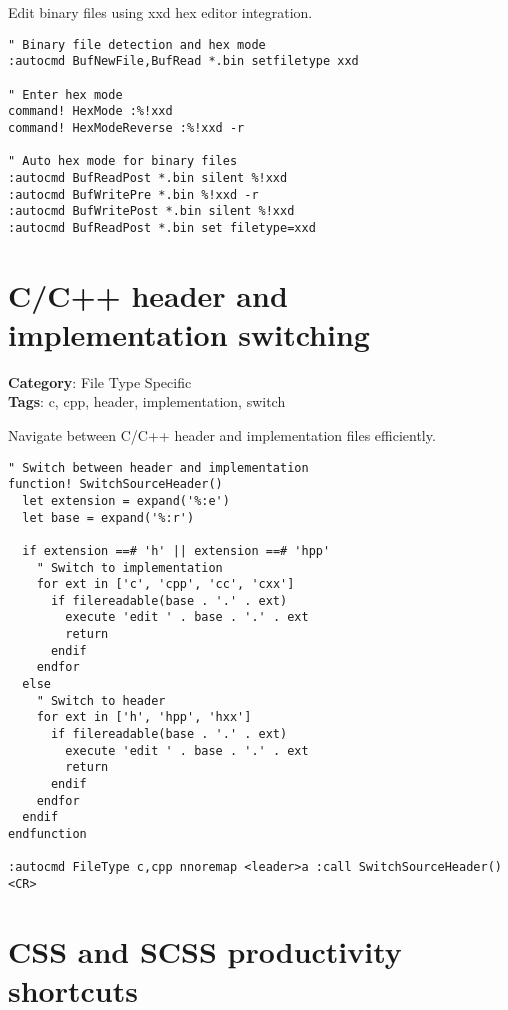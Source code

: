 {{{{{{Edit binary files using xxd hex editor integration.

\begin{Exa*}{}
\begin{Verbatim}[fontsize=\footnotesize, breaklines, breakanywhere]
" Binary file detection and hex mode
:autocmd BufNewFile,BufRead *.bin setfiletype xxd

" Enter hex mode
command! HexMode :%!xxd
command! HexModeReverse :%!xxd -r

" Auto hex mode for binary files
:autocmd BufReadPost *.bin silent %!xxd
:autocmd BufWritePre *.bin %!xxd -r
:autocmd BufWritePost *.bin silent %!xxd
:autocmd BufReadPost *.bin set filetype=xxd
\end{Verbatim}
\end{Exa*}

\section{C/C++ header and implementation switching}

\textbf{Category}: File Type Specific\\ \textbf{Tags}: c, cpp, header, implementation, switch
\vspace{0.5cm}

Navigate between C/C++ header and implementation files efficiently.

\begin{Exa*}{}
\begin{Verbatim}[fontsize=\footnotesize, breaklines, breakanywhere]
" Switch between header and implementation
function! SwitchSourceHeader()
  let extension = expand('%:e')
  let base = expand('%:r')
  
  if extension ==# 'h' || extension ==# 'hpp'
    " Switch to implementation
    for ext in ['c', 'cpp', 'cc', 'cxx']
      if filereadable(base . '.' . ext)
        execute 'edit ' . base . '.' . ext
        return
      endif
    endfor
  else
    " Switch to header
    for ext in ['h', 'hpp', 'hxx']
      if filereadable(base . '.' . ext)
        execute 'edit ' . base . '.' . ext
        return
      endif
    endfor
  endif
endfunction

:autocmd FileType c,cpp nnoremap <leader>a :call SwitchSourceHeader()<CR>
\end{Verbatim}
\end{Exa*}

\section{CSS and SCSS productivity shortcuts}

}}}}}}
